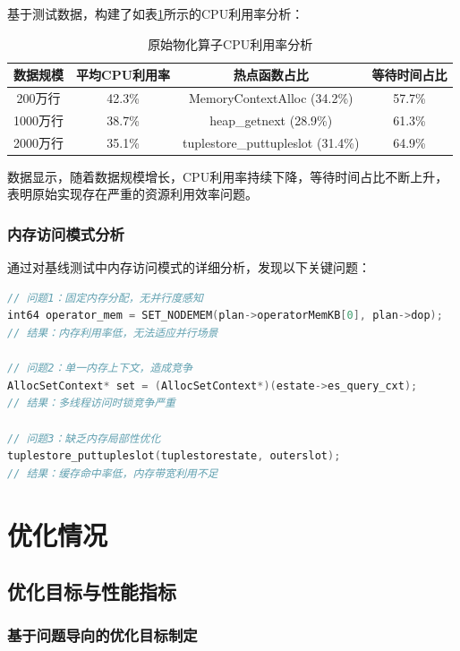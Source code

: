 基于测试数据，构建了如表\ref{tab:cpu_analysis}所示的CPU利用率分析：

\begin{table}[htbp]
\centering
\caption{原始物化算子CPU利用率分析}
\label{tab:cpu_analysis}
\begin{tabular}{|c|c|c|c|}
\hline
数据规模 & 平均CPU利用率 & 热点函数占比 & 等待时间占比 \\
\hline
200万行 & 42.3\% & MemoryContextAlloc (34.2\%) & 57.7\% \\
1000万行 & 38.7\% & heap\_getnext (28.9\%) & 61.3\% \\
2000万行 & 35.1\% & tuplestore\_puttupleslot (31.4\%) & 64.9\% \\
\hline
\end{tabular}
\end{table}

数据显示，随着数据规模增长，CPU利用率持续下降，等待时间占比不断上升，表明原始实现存在严重的资源利用效率问题。

\subsubsection{内存访问模式分析}

通过对基线测试中内存访问模式的详细分析，发现以下关键问题：

\begin{lstlisting}[language=C, caption=原始内存分配模式问题示例]
// 问题1：固定内存分配，无并行度感知
int64 operator_mem = SET_NODEMEM(plan->operatorMemKB[0], plan->dop);
// 结果：内存利用率低，无法适应并行场景

// 问题2：单一内存上下文，造成竞争
AllocSetContext* set = (AllocSetContext*)(estate->es_query_cxt);
// 结果：多线程访问时锁竞争严重

// 问题3：缺乏内存局部性优化
tuplestore_puttupleslot(tuplestorestate, outerslot);
// 结果：缓存命中率低，内存带宽利用不足
\end{lstlisting}

\section{优化情况}

\subsection{优化目标与性能指标}

\subsubsection{基于问题导向的优化目标制定}

